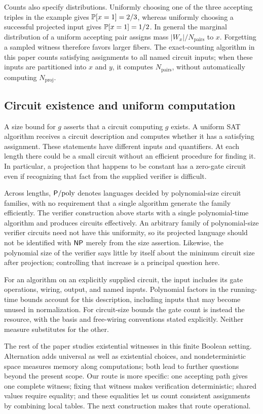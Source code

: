 Counts also specify distributions. Uniformly choosing one of the three
accepting triples in the example gives $\mathbb{P}[x=1]=2/3$, whereas uniformly
choosing a successful projected input gives $\mathbb{P}[x=1]=1/2$.
In general the marginal distribution of a uniform accepting pair assigns
mass $|W_x|/N_{\mathrm{pairs}}$ to $x$. Forgetting a sampled witness
therefore favors larger fibers. The exact-counting algorithm in this
paper counts satisfying assignments to all named circuit inputs; when
these inputs are partitioned into $x$ and $y$, it computes
$N_{\mathrm{pairs}}$, without automatically computing $N_{\mathrm{proj}}$.

\subsection{Circuit existence and uniform computation}

A size bound for $g$ asserts that a circuit computing $g$ exists. A
uniform SAT algorithm receives a circuit description and computes whether
it has a satisfying assignment. These statements have different inputs
and quantifiers. At each length there could be a small circuit without
an efficient procedure for finding it. In particular, a projection that
happens to be constant has a zero-gate circuit even if recognizing that
fact from the supplied verifier is difficult.

Across lengths, $\mathsf{P}/\mathrm{poly}$ denotes languages decided by polynomial-size
circuit families, with no requirement that a single algorithm generate
the family efficiently. The verifier construction above starts with a
single polynomial-time algorithm and produces circuits effectively.
An arbitrary family of polynomial-size verifier circuits need not have
this uniformity, so its projected language should not be identified with
$\mathsf{NP}$ merely from the size assertion. Likewise, the polynomial size of
the verifier says little by itself about the minimum circuit size after
projection; controlling that increase is a principal question here.

For an algorithm on an explicitly supplied circuit, the input includes its
gate operations, wiring, output, and named inputs. Polynomial factors in
the running-time bounds account for this description, including inputs
that may become unused in normalization. For circuit-size bounds the
gate count is instead the resource, with the basis and free-wiring
conventions stated explicitly. Neither measure substitutes for the other.

The rest of the paper studies existential witnesses in this finite
Boolean setting. Alternation adds universal as well as existential
choices, and nondeterministic space measures memory along computations;
both lead to further questions beyond the present scope. Our route is
more specific: one accepting path gives one complete witness; fixing
that witness makes verification deterministic; shared values require
equality; and these equalities let us count consistent assignments by
combining local tables. The next construction makes that route operational.
